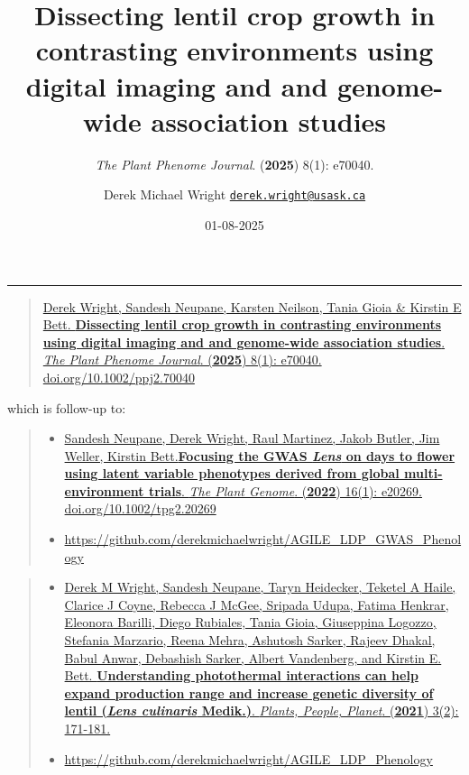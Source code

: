 \documentclass[
]{article}
\title{Dissecting lentil crop growth in contrasting environments using
digital imaging and and genome-wide association studies}
\subtitle{\emph{The Plant Phenome Journal}. (\textbf{2025}) 8(1):
e70040.}
\author{Derek Michael Wright
\href{mailto:derek.wright@usask.ca}{\nolinkurl{derek.wright@usask.ca}}}
\date{01-08-2025}
\providecommand{\tightlist}{%
  \setlength{\itemsep}{0pt}\setlength{\parskip}{0pt}}
\begin{document}
\maketitle

{
\setcounter{tocdepth}{2}
\tableofcontents
}
\begin{center}\rule{0.5\linewidth}{0.5pt}\end{center}

\begin{quote}
\href{https://doi.org/10.1002/ppj2.70040}{Derek Wright, Sandesh Neupane,
Karsten Neilson, Tania Gioia \& Kirstin E Bett. \textbf{Dissecting
lentil crop growth in contrasting environments using digital imaging and
and genome-wide association studies}. \emph{The Plant Phenome Journal}.
(\textbf{2025}) 8(1): e70040. doi.org/10.1002/ppj2.70040}
\end{quote}

which is follow-up to:

\begin{quote}
\begin{itemize}
\tightlist
\item
  \href{https://doi.org/10.1002/tpg2.20269}{Sandesh Neupane, Derek
  Wright, Raul Martinez, Jakob Butler, Jim Weller, Kirstin
  Bett.\textbf{Focusing the GWAS \emph{Lens} on days to flower using
  latent variable phenotypes derived from global multi-environment
  trials}. \emph{The Plant Genome}. (\textbf{2022}) 16(1): e20269.
  doi.org/10.1002/tpg2.20269}
\item
  \url{https://github.com/derekmichaelwright/AGILE_LDP_GWAS_Phenology}
\end{itemize}
\end{quote}

\begin{quote}
\begin{itemize}
\tightlist
\item
  \href{https://doi.org/10.1002/ppp3.10158}{Derek M Wright, Sandesh
  Neupane, Taryn Heidecker, Teketel A Haile, Clarice J Coyne, Rebecca J
  McGee, Sripada Udupa, Fatima Henkrar, Eleonora Barilli, Diego
  Rubiales, Tania Gioia, Giuseppina Logozzo, Stefania Marzario, Reena
  Mehra, Ashutosh Sarker, Rajeev Dhakal, Babul Anwar, Debashish Sarker,
  Albert Vandenberg, and Kirstin E. Bett. \textbf{Understanding
  photothermal interactions can help expand production range and
  increase genetic diversity of lentil (\emph{Lens culinaris} Medik.)}.
  \emph{Plants, People, Planet}. (\textbf{2021}) 3(2): 171-181.}
\item
  \url{https://github.com/derekmichaelwright/AGILE_LDP_Phenology}
\end{itemize}
\end{quote}
\end{document}
